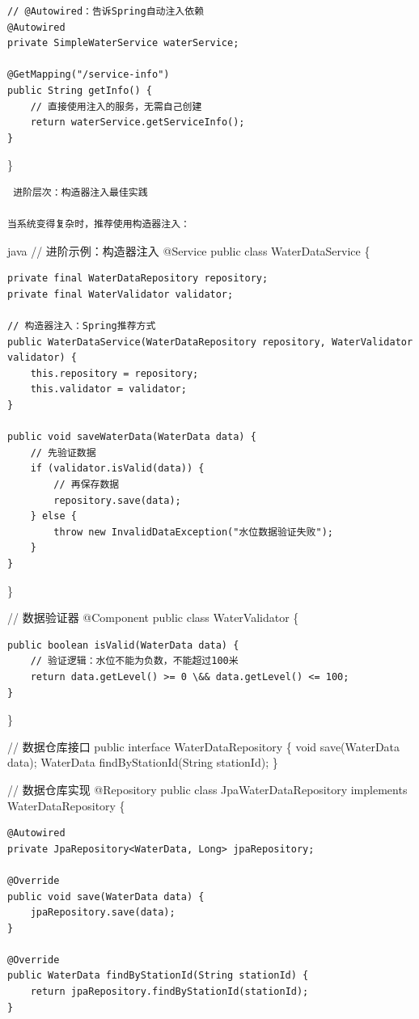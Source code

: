 \begin{verbatim}
// @Autowired：告诉Spring自动注入依赖
@Autowired
private SimpleWaterService waterService;

@GetMapping("/service-info")
public String getInfo() {
    // 直接使用注入的服务，无需自己创建
    return waterService.getServiceInfo();
}
\end{verbatim}

\}

\begin{lstlisting}
 进阶层次：构造器注入最佳实践

当系统变得复杂时，推荐使用构造器注入：
\end{lstlisting}

java // 进阶示例：构造器注入 @Service public class WaterDataService \{

\begin{verbatim}
private final WaterDataRepository repository;
private final WaterValidator validator;

// 构造器注入：Spring推荐方式
public WaterDataService(WaterDataRepository repository, WaterValidator validator) {
    this.repository = repository;
    this.validator = validator;
}

public void saveWaterData(WaterData data) {
    // 先验证数据
    if (validator.isValid(data)) {
        // 再保存数据
        repository.save(data);
    } else {
        throw new InvalidDataException("水位数据验证失败");
    }
}
\end{verbatim}

\}

// 数据验证器 @Component public class WaterValidator \{

\begin{verbatim}
public boolean isValid(WaterData data) {
    // 验证逻辑：水位不能为负数，不能超过100米
    return data.getLevel() >= 0 \&& data.getLevel() <= 100;
}
\end{verbatim}

\}

// 数据仓库接口 public interface WaterDataRepository \{ void save(WaterData data); WaterData findByStationId(String stationId); \}

// 数据仓库实现 @Repository public class JpaWaterDataRepository implements WaterDataRepository \{

\begin{verbatim}
@Autowired
private JpaRepository<WaterData, Long> jpaRepository;

@Override
public void save(WaterData data) {
    jpaRepository.save(data);
}

@Override
public WaterData findByStationId(String stationId) {
    return jpaRepository.findByStationId(stationId);
}
\end{verbatim}

